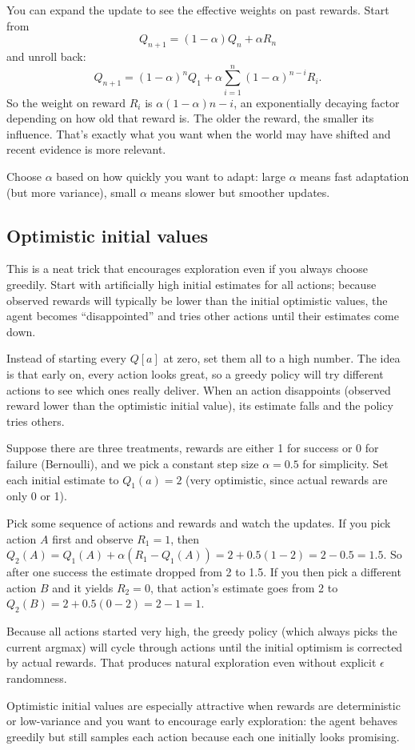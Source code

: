 You can expand the update to see the effective weights on past rewards. Start from 
\begin{equation*}
    Q_{n+1}=(1-\alpha)Q_n+\alpha R_n    
\end{equation*}
and unroll back:
\begin{equation*}
    Q_{n+1}=(1-\alpha)^nQ_1+\alpha\sum_{i=1}^n(1-\alpha)^{n-i}R_i.    
\end{equation*}
So the weight on reward $R_i$ is $\alpha(1-\alpha)n-i$, an exponentially decaying factor depending on how old that reward is. The older the reward, the smaller its influence. That’s exactly what you want when the world may have shifted and recent evidence is more relevant.

Choose $\alpha$ based on how quickly you want to adapt: large $\alpha$ means fast adaptation (but more variance), small $\alpha$ means slower but smoother updates.

\subsection{Optimistic initial values}
This is a neat trick that encourages exploration even if you always choose greedily. Start with artificially high initial estimates for all actions; because observed rewards will typically be lower than the initial optimistic values, the agent becomes “disappointed” and tries other actions until their estimates come down.

Instead of starting every $Q[a]$ at zero, set them all to a high number. The idea is that early on, every action looks great, so a greedy policy will try different actions to see which ones really deliver. When an action disappoints (observed reward lower than the optimistic initial value), its estimate falls and the policy tries others.

Suppose there are three treatments, rewards are either 1 for success or 0 for failure (Bernoulli), and we pick a constant step size $\alpha=0.5$ for simplicity. Set each initial estimate to $Q_1(a)=2$ (very optimistic, since actual rewards are only 0 or 1).

Pick some sequence of actions and rewards and watch the updates. If you pick action $A$ first and observe $R_1=1$, then $Q_2(A)=Q_1(A)+\alpha(R_1-Q_1(A))=2+0.5(1-2)=2-0.5=1.5$. So after one success the estimate dropped from 2 to 1.5. If you then pick a different action $B$ and it yields $R_2=0$, that action’s estimate goes from 2 to $Q_2(B)=2+0.5(0-2)=2-1=1$.

Because all actions started very high, the greedy policy (which always picks the current argmax) will cycle through actions until the initial optimism is corrected by actual rewards. That produces natural exploration even without explicit $\epsilon$ randomness.

Optimistic initial values are especially attractive when rewards are deterministic or low-variance and you want to encourage early exploration: the agent behaves greedily but still samples each action because each one initially looks promising.
